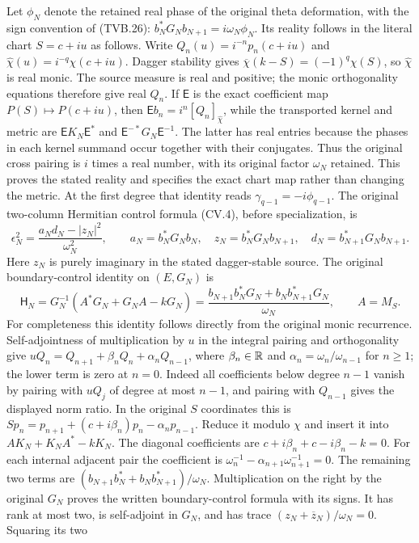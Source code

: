 Let $\phi_N$ denote the retained real phase of the original
theta deformation, with the sign convention of (TVB.26):
$b_N^*G_Nb_{N+1}=i\omega_N\phi_N$.
Its reality follows in the literal chart $S=c+iu$ as follows.
Write $Q_n(u)=i^{-n}p_n(c+iu)$ and
$\widehat\chi(u)=i^{-q}\chi(c+iu)$. Dagger stability gives
$\overline\chi(k-S)=(-1)^q\chi(S)$, so $\widehat\chi$
is real monic. The source measure is real and positive; the
monic orthogonality equations therefore give real $Q_n$.
If $\mathsf E$ is the exact coefficient map
$P(S)\mapsto P(c+iu)$, then
$\mathsf E b_n=i^n[Q_n]_{\widehat\chi}$, while the transported
kernel and metric are $\mathsf E K_N\mathsf E^*$ and
$\mathsf E^{-*}G_N\mathsf E^{-1}$.
The latter has real entries because the phases in each kernel
summand occur together with their conjugates. Thus the original
cross pairing is $i$ times a real number, with its original
factor $\omega_N$ retained. This proves the stated reality
and specifies the exact chart map rather than changing the metric.
At the first degree that identity reads
$\gamma_{q-1}=-i\phi_{q-1}$. The original two-column Hermitian
control formula (CV.4), before specialization, is
\[
 \epsilon_N^2=
 \frac{a_N d_N-|z_N|^2}{\omega_N^2},\qquad
 a_N=b_N^*G_Nb_N,\quad z_N=b_N^*G_Nb_{N+1},\quad
 d_N=b_{N+1}^*G_Nb_{N+1}.
 \tag{CJ.5}
\]
Here $z_N$ is purely imaginary in the stated dagger-stable
source. The original boundary-control identity on $(E,G_N)$ is
\[
 \mathsf H_N=G_N^{-1}(A^*G_N+G_NA-kG_N)
 =\frac{b_{N+1}b_N^*G_N+b_Nb_{N+1}^*G_N}{\omega_N},
 \qquad A=M_S.
\]
For completeness this identity follows directly from the original
monic recurrence. Self-adjointness of multiplication by $u$ in
the integral pairing and orthogonality give
$uQ_n=Q_{n+1}+\beta_nQ_n+\alpha_nQ_{n-1}$, where
$\beta_n\in\mathbb R$ and $\alpha_n=\omega_n/\omega_{n-1}$ for
$n\ge1$; the lower term is zero at $n=0$.
Indeed all coefficients below degree $n-1$ vanish by pairing
with $uQ_j$ of degree at most $n-1$, and pairing with
$Q_{n-1}$ gives the displayed norm ratio. In the original
$S$ coordinates this is
$Sp_n=p_{n+1}+(c+i\beta_n)p_n-\alpha_np_{n-1}$.
Reduce it modulo $\chi$ and insert it into
$AK_N+K_NA^*-kK_N$. The diagonal coefficients are
$c+i\beta_n+c-i\beta_n-k=0$. For each internal adjacent
pair the coefficient is
$\omega_n^{-1}-\alpha_{n+1}\omega_{n+1}^{-1}=0$.
The remaining two terms are
$(b_{N+1}b_N^*+b_Nb_{N+1}^*)/\omega_N$.
Multiplication on the right by the original $G_N$ proves
the written boundary-control formula with its signs.
It has rank at most two, is self-adjoint in $G_N$, and has
trace $(z_N+\overline z_N)/\omega_N=0$. Squaring its two

